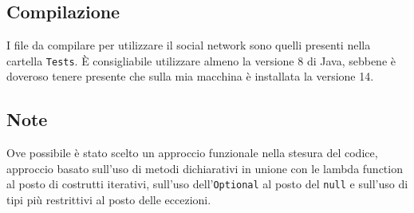 \documentclass[a4paper,10pt]{article}
\begin{document}
\subsection*{Compilazione}

I file da compilare per utilizzare il social network sono quelli presenti nella cartella \texttt{Tests}. È consigliabile utilizzare almeno la versione 8 di Java,
sebbene è doveroso tenere presente che sulla mia macchina è installata la versione 14.

\subsection*{Note}
Ove possibile è stato scelto un approccio funzionale nella stesura del codice, approccio basato sull'uso di metodi dichiarativi in unione con le lambda function
al posto di costrutti iterativi, sull'uso dell'\texttt{Optional} al posto del \texttt{null} e sull'uso di tipi più restrittivi al posto delle eccezioni.
\end{document}
